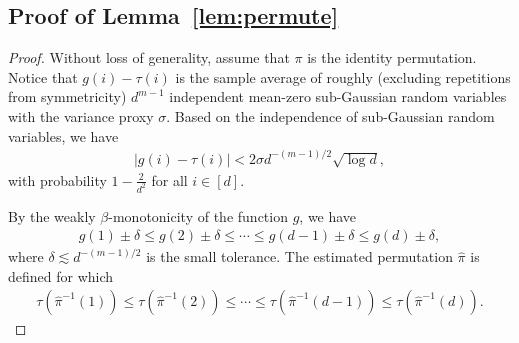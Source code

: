 \documentclass[11pt]{article}
\theoremstyle{definition}
\begin{document}
\subsection{Proof of Lemma~\ref{lem:permute}}
\begin{proof}
Without loss of generality, assume that $\pi$ is the identity permutation. 
Notice that $g(i)-\tau(i)$ is the sample average of roughly (excluding repetitions from symmetricity) $d^{m-1}$ independent mean-zero sub-Gaussian random variables with the variance proxy $\sigma$. Based on the independence of sub-Gaussian random variables, we have
\begin{align}\label{eq:concentration}
    |g(i)-\tau(i)| < 2\sigma d^{-(m-1)/2}\sqrt{\log d},
\end{align}
with probability $1-\frac{2}{d^2}$ for all $i\in[d]$. 

By the weakly $\beta$-monotonicity of the function $g$, we have
\begin{align}\label{eq:mon1}
    g(1)\pm \delta \leq g(2) \pm \delta  \leq \cdots \leq g(d-1)\pm \delta  \leq g(d)\pm \delta,
\end{align}
where $\delta\lesssim d^{-(m-1)/2}$ is the small tolerance. 
The estimated permutation $\hat\pi$ is defined for which
\begin{align}\label{eq:mon2}
    \tau(\hat\pi^{-1}(1))\leq\tau(\hat\pi^{-1}(2))\leq \cdots\leq \tau(\hat\pi^{-1}(d-1))\leq \tau(\hat\pi^{-1}(d)).
\end{align}


\end{proof}
\end{document}
